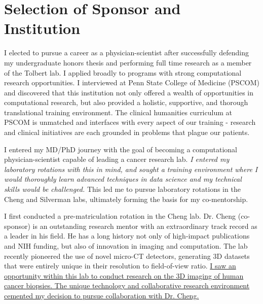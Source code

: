 \documentclass{NIHGrant}
\begin{document}
\part*{Selection of Sponsor and Institution}
I elected to pursue a career as a physician-scientist after successfully defending my undergraduate honors thesis and performing full time research as a member of the Tolbert lab. I applied broadly to programs with strong computational research opportunities. I interviewed at Penn State College of Medicine (PSCOM) and discovered that this institution not only offered a wealth of opportunities in computational research, but also provided a holistic, supportive, and thorough translational training environment. The clinical humanities curriculum at PSCOM is unmatched and interfaces with every aspect of our training - research and clinical initiatives are each grounded in problems that plague our patients.

I entered my MD/PhD journey with the goal of becoming a computational physician-scientist capable of leading a cancer research lab. \emph{I entered my laboratory rotations with this in mind, and sought a training environment where I would thoroughly learn advanced techniques in data science and my technical skills would be challenged.} This led me to pursue laboratory rotations in the Cheng and Silverman labs, ultimately forming the basis for my co-mentorship.

I first conducted a pre-matriculation rotation in the Cheng lab. Dr. Cheng (co-sponsor) is an outstanding research mentor with an extraordinary track record as a leader in his field. He has a long history not only of high-impact publications and NIH funding, but also of innovation in imaging and computation. The lab recently pioneered the use of novel micro-CT detectors, generating 3D datasets that were entirely unique in their resolution to field-of-view ratio. \uline{I saw an opportunity within this lab to conduct research on the 3D imaging of human cancer biopsies. The unique technology and collaborative research environment cemented my decision to pursue collaboration with Dr. Cheng.}
\end{document}
